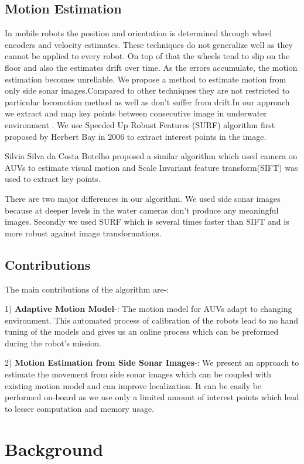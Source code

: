 \documentclass[12pt]{dalcsthesis}
\begin{document}
\section{Motion Estimation}
In mobile robots the position and orientation is determined through wheel encoders and velocity estimates. These techniques do not generalize well as they cannot be applied to every robot. On top of that the wheels tend to slip on the floor and also the estimates drift over time. As the errors accumulate, the motion estimation becomes unreliable. 
We propose a method to estimate motion from only side sonar images.Compared to other techniques they are not restricted to particular locomotion method as well as don't suffer from drift.In our approach we extract and map key points between consecutive image in underwater environment . We use Speeded Up Robust Features (SURF) algorithm first proposed by Herbert Bay in 2006 to extract interest points in the image. 

Silvia Silva da Costa Botelho proposed a similar algorithm which used camera on AUVs to estimate visual motion and Scale Invariant feature transform(SIFT) was used to extract key points. 

There are two major differences in our algorithm. We used side sonar images because at deeper levels in the water cameras don't produce any meaningful images. Secondly we used SURF which is several times faster than SIFT and is more robust against image transformations. 

\section{Contributions}
The main contributions of the algorithm are-:

1) \textbf{Adaptive Motion Model}-: The motion model for AUVs adapt to changing environment. This automated process of calibration of the robots lead to no hand tuning of the models and gives us an online process which can be preformed during the robot's mission.  

2) \textbf{Motion Estimation from Side Sonar Images}-: We present an approach to estimate the movement from side sonar images which can be coupled with existing motion model and can improve localization. It can be easily be performed on-board as we use only a limited amount of interest points which lead to lesser computation and memory usage. 
\chapter{Background}
\end{document}
